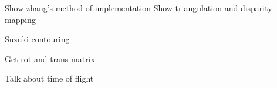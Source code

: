 
Show zhang's method of implementation 
Show triangulation and disparity mapping

Suzuki contouring

Get rot and trans matrix

Talk about time of flight